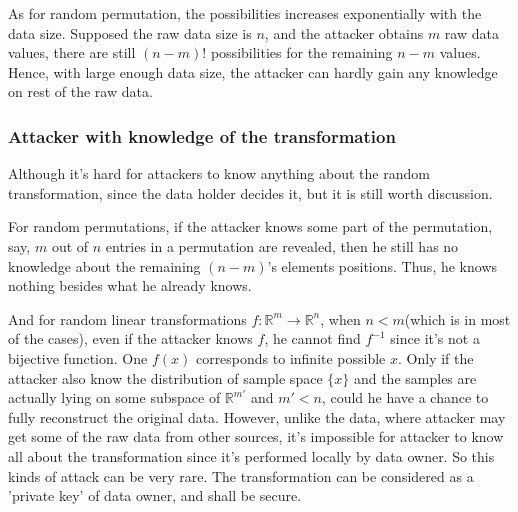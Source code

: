 As for random permutation, the possibilities increases exponentially with the data size. Supposed the raw data size is $n$, and the attacker obtains $m$ raw data values, there are still $(n-m)!$ possibilities for the remaining $n - m$ values. Hence, with large enough data size, the attacker can hardly gain any knowledge on rest of the raw data.
\subsubsection{Attacker with knowledge of the transformation}
Although it's hard for attackers to know anything about the random transformation, since the data holder decides it, but it is still worth discussion. 

For random permutations, if the attacker knows some part of the permutation, say, $m$ out of $n$ entries in a permutation are revealed, then he still has no knowledge about the remaining $(n - m)$'s elements positions. Thus, he knows nothing besides what he already knows. 

And for random linear transformations $f: \mathbb R^m \rightarrow \mathbb R^n$, when $n < m$(which is in most of the cases), even if the attacker knows $f$, he cannot find $f^{-1}$ since it's not a bijective function. One $f(x)$ corresponds to infinite possible $x$. Only if the attacker also know the distribution of sample space $\{x\}$ and the samples are actually lying on some subspace of $\mathbb R^{m'}$ and $m' < n$, could he have a chance to fully reconstruct the original data. However, unlike the data, where attacker may get some of the raw data from other sources, it's impossible for attacker to know all about the transformation since it's performed locally by data owner. So this kinds of attack can be very rare. The transformation can be considered as a 'private key' of data owner, and shall be secure.

